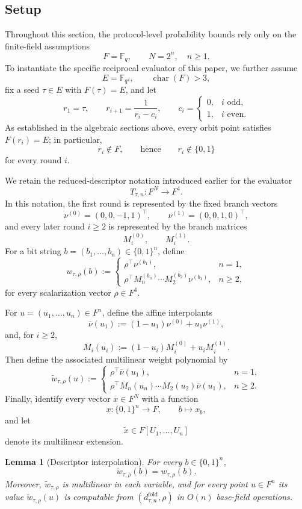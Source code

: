 \documentclass[11pt]{article}
\newtheorem{lemma}[theorem]{Lemma}
\begin{document}
\subsection{Setup}

Throughout this section, the protocol-level probability bounds rely only on the finite-field assumptions
\[
F=\mathbb F_q,
\qquad
N=2^n,
\quad n\ge 1.
\]
To instantiate the specific reciprocal evaluator of this paper, we further assume
\[
E=\mathbb F_{q^4},
\qquad
\operatorname{char}(F)>3,
\]
fix a seed $\tau\in E$ with $F(\tau)=E$, and let
\[
r_1=\tau,
\qquad
r_{i+1}=\frac{1}{r_i-c_i},
\qquad
c_i=
\begin{cases}
0,& i\text{ odd},\\
1,& i\text{ even}.
\end{cases}
\]
As established in the algebraic sections above, every orbit point satisfies $F(r_i)=E$; in particular,
\[
r_i\notin F,
\qquad\text{hence}\qquad
r_i\notin\{0,1\}
\]
for every round $i$.

We retain the reduced-descriptor notation introduced earlier for the evaluator
\[
T_{\tau,n}:F^N\to F^4.
\]
In this notation, the first round is represented by the fixed branch vectors
\[
\nu^{(0)}=(0,0,-1,1)^\top,
\qquad
\nu^{(1)}=(0,0,1,0)^\top,
\]
and every later round $i\ge 2$ is represented by the branch matrices
\[
M_i^{(0)},
\qquad
M_i^{(1)}.
\]
For a bit string $b=(b_1,\dots,b_n)\in\{0,1\}^n$, define
\[
w_{\tau,\rho}(b):=
\begin{cases}
\rho^\top\nu^{(b_1)},& n=1,\\[0.5ex]
\rho^\top M_n^{(b_n)}\cdots M_2^{(b_2)}\nu^{(b_1)},& n\ge 2,
\end{cases}
\]
for every scalarization vector $\rho\in F^4$.

For $u=(u_1,\dots,u_n)\in F^n$, define the affine interpolants
\[
\overline\nu(u_1):=(1-u_1)\nu^{(0)}+u_1\nu^{(1)},
\]
and, for $i\ge 2$,
\[
\overline M_i(u_i):=(1-u_i)M_i^{(0)}+u_iM_i^{(1)}.
\]
Then define the associated multilinear weight polynomial by
\[
\widetilde w_{\tau,\rho}(u):=
\begin{cases}
\rho^\top\overline\nu(u_1),& n=1,\\[0.5ex]
\rho^\top\overline M_n(u_n)\cdots \overline M_2(u_2)\overline\nu(u_1),& n\ge 2.
\end{cases}
\]
Finally, identify every vector $x\in F^N$ with a function
\[
x:\{0,1\}^n\to F,
\qquad
b\longmapsto x_b,
\]
and let
\[
\widetilde x\in F[U_1,\dots,U_n]
\]
denote its multilinear extension.

\begin{lemma}[Descriptor interpolation]
\label{lem:it-descriptor-interpolation}
For every $b\in\{0,1\}^n$,
\[
\widetilde w_{\tau,\rho}(b)=w_{\tau,\rho}(b).
\]
Moreover, $\widetilde w_{\tau,\rho}$ is multilinear in each variable, and for every point $u\in F^n$ its value $\widetilde w_{\tau,\rho}(u)$ is computable from $(d^{\mathrm{fold}}_{\tau,n},\rho)$ in $O(n)$ base-field operations.
\end{lemma}
\end{document}
